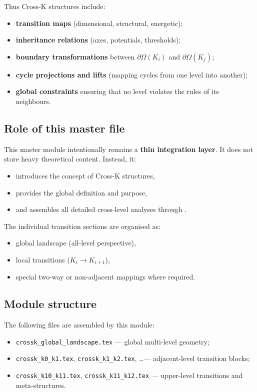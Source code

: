 Thus Cross-K structures include:
\begin{itemize}
  \item \textbf{transition maps} (dimensional, structural, energetic);
  \item \textbf{inheritance relations} (axes, potentials, thresholds);
  \item \textbf{boundary transformations} between $\partial\Omega(K_i)$ and
        $\partial\Omega(K_j)$;
  \item \textbf{cycle projections and lifts} (mapping cycles from one level
        into another);
  \item \textbf{global constraints} ensuring that no level violates the
        rules of its neighbours.
\end{itemize}

\subsection{Role of this master file}
This master module intentionally remains a \textbf{thin integration layer}.  
It does not store heavy theoretical content. Instead, it:
\begin{itemize}
  \item introduces the concept of Cross-K structures,
  \item provides the global definition and purpose,
  \item and assembles all detailed cross-level analyses through \verb||.
\end{itemize}

The individual transition sections are organised as:
\begin{itemize}
  \item global landscape (all-level perspective),
  \item local transitions ($K_i \rightarrow K_{i+1}$),
  \item special two-way or non-adjacent mappings where required.
\end{itemize}

\subsection{Module structure}
\noindent The following files are assembled by this module:
\begin{itemize}
  \item \verb|crossk_global_landscape.tex| — global multi-level geometry;
  \item \verb|crossk_k0_k1.tex|, \verb|crossk_k1_k2.tex|, \dots —
        adjacent-level transition blocks;
  \item \verb|crossk_k10_k11.tex|, \verb|crossk_k11_k12.tex| — upper-level
        transitions and meta-structures.
\end{itemize}

